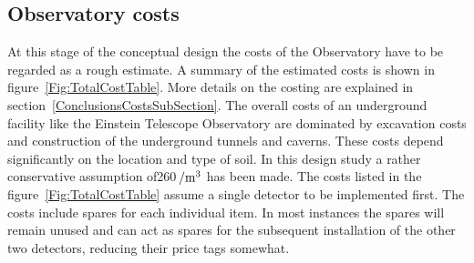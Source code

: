 \subsection{Observatory costs}
At this stage of the conceptual design the costs of the Observatory have to be regarded as a rough estimate. A summary of the estimated costs is shown in figure~\ref{Fig:TotalCostTable}. More details on the costing are explained in section~\ref{ConclusionsCostsSubSection}. 
The overall costs of an underground facility like the Einstein Telescope Observatory are dominated by excavation costs and construction of the underground tunnels and caverns. These costs depend significantly on the location and type of soil. In this design study a rather conservative assumption of260\,\texteuro$\rm{/m^3}$  has been made. The costs listed in the figure~\ref{Fig:TotalCostTable} assume a single detector to be implemented first. The costs include spares for each individual item. In most instances the spares will remain unused and can act as spares for the subsequent installation of the other two detectors, reducing their price tags somewhat.
